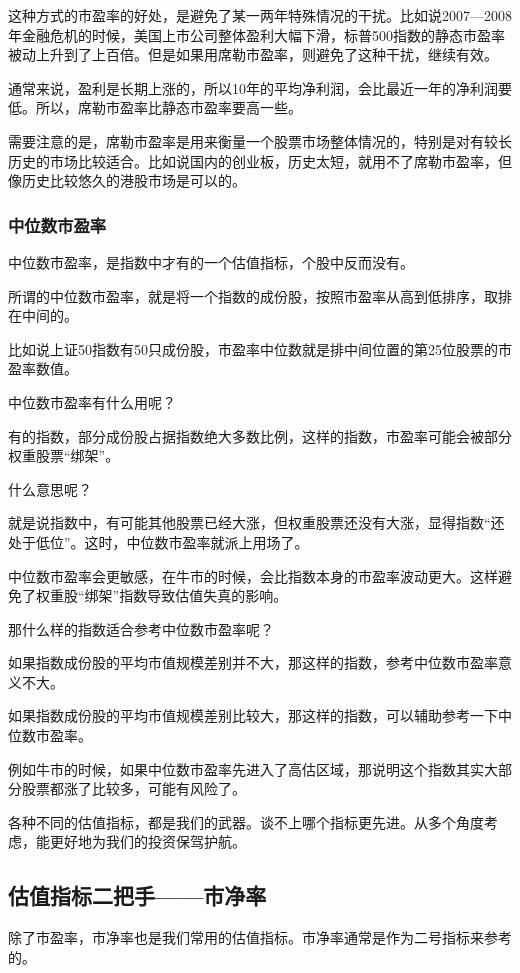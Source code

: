 这种方式的市盈率的好处，是避免了某一两年特殊情况的干扰。比如说2007—2008年金融危机的时候，美国上市公司整体盈利大幅下滑，标普500指数的静态市盈率被动上升到了上百倍。但是如果用席勒市盈率，则避免了这种干扰，继续有效。

通常来说，盈利是长期上涨的，所以10年的平均净利润，会比最近一年的净利润要低。所以，席勒市盈率比静态市盈率要高一些。

需要注意的是，席勒市盈率是用来衡量一个股票市场整体情况的，特别是对有较长历史的市场比较适合。比如说国内的创业板，历史太短，就用不了席勒市盈率，但像历史比较悠久的港股市场是可以的。

\subsubsection{中位数市盈率}

中位数市盈率，是指数中才有的一个估值指标，个股中反而没有。

所谓的中位数市盈率，就是将一个指数的成份股，按照市盈率从高到低排序，取排在中间的。

比如说上证50指数有50只成份股，市盈率中位数就是排中间位置的第25位股票的市盈率数值。

中位数市盈率有什么用呢？

有的指数，部分成份股占据指数绝大多数比例，这样的指数，市盈率可能会被部分权重股票“绑架”。

什么意思呢？

就是说指数中，有可能其他股票已经大涨，但权重股票还没有大涨，显得指数“还处于低位”。这时，中位数市盈率就派上用场了。

中位数市盈率会更敏感，在牛市的时候，会比指数本身的市盈率波动更大。这样避免了权重股“绑架”指数导致估值失真的影响。

那什么样的指数适合参考中位数市盈率呢？

如果指数成份股的平均市值规模差别并不大，那这样的指数，参考中位数市盈率意义不大。

如果指数成份股的平均市值规模差别比较大，那这样的指数，可以辅助参考一下中位数市盈率。

例如牛市的时候，如果中位数市盈率先进入了高估区域，那说明这个指数其实大部分股票都涨了比较多，可能有风险了。

各种不同的估值指标，都是我们的武器。谈不上哪个指标更先进。从多个角度考虑，能更好地为我们的投资保驾护航。

\subsection{估值指标二把手——市净率}
除了市盈率，市净率也是我们常用的估值指标。市净率通常是作为二号指标来参考的。

